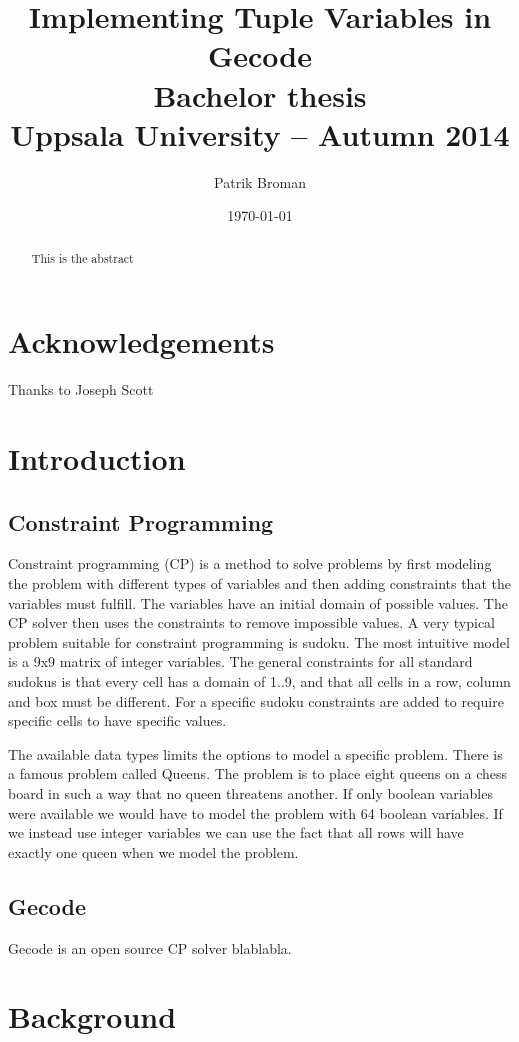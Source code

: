 \documentclass[a4paper,11pt]{article}
\title{\textbf{Implementing Tuple Variables in Gecode \\
	Bachelor thesis \\
    Uppsala University -- Autumn 2014 \\
  }
}
\author{Patrik Broman}
\date{\today}
\begin{document}
\begin{abstract}
This is the abstract
\end{abstract}

\tableofcontents
\section{Acknowledgements}
Thanks to Joseph Scott
\section{Introduction}
\subsection{Constraint Programming}

Constraint programming (CP) is a method to solve problems by first modeling the problem with different types of variables and then adding constraints that the variables must fulfill. The variables have an initial domain of possible values. The CP solver then uses the constraints to remove impossible values. A very typical problem suitable for constraint programming is sudoku. The most intuitive model is a 9x9 matrix of integer variables. The general constraints for all standard sudokus is that every cell has a domain of 1..9, and that all cells in a row, column and box must be different. For a specific sudoku constraints are added to require specific cells to have specific values.

The available data types limits the options to model a specific problem. There is a famous problem called Queens. The problem is to place eight queens on a chess board in such a way that no queen threatens another. If only boolean variables were available we would have to model the problem with 64 boolean variables. If we instead use integer variables we can use the fact that all rows will have exactly one queen when we model the problem.

\subsection{Gecode}
Gecode is an open source CP solver blablabla.

\section{Background}
\end{document}
